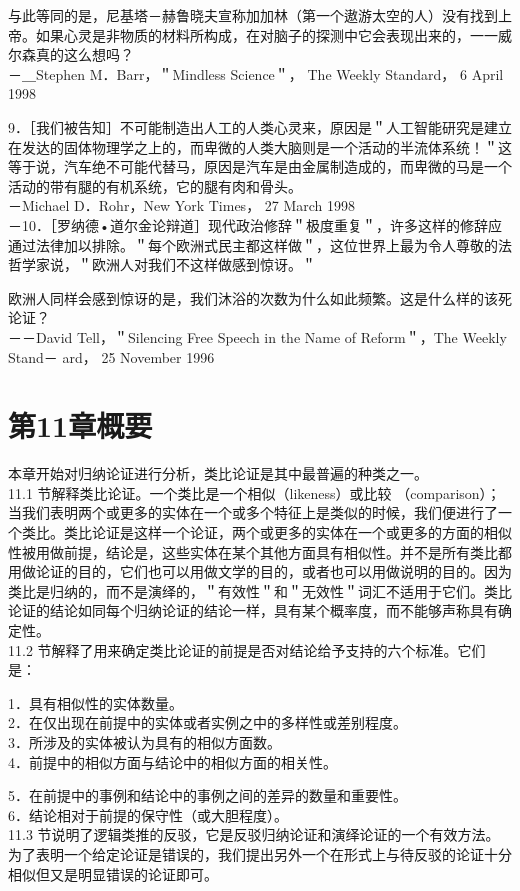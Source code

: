与此等同的是，尼基塔－赫鲁晓夫宣称加加林（第一个遨游太空的人）没有找到上帝。如果心灵是非物质的材料所构成，在对脑子的探测中它会表现出来的，一一威尔森真的这么想吗？\\
－＿Stephen M．Barr，＂Mindless Science＂， The Weekly Standard， 6 April 1998

9．［我们被告知］不可能制造出人工的人类心灵来，原因是＂人工智能研究是建立在发达的固体物理学之上的，而卑微的人类大脑则是一个活动的半流体系统！＂这等于说，汽车绝不可能代替马，原因是汽车是由金属制造成的，而卑微的马是一个活动的带有腿的有机系统，它的腿有肉和骨头。\\
－Michael D．Rohr，New York Times， 27 March 1998\\
－10．［罗纳德•道尔金论辩道］现代政治修辞＂极度重复＂，许多这样的修辞应通过法律加以排除。＂每个欧洲式民主都这样做＂，这位世界上最为令人尊敬的法哲学家说，＂欧洲人对我们不这样做感到惊讶。＂

欧洲人同样会感到惊讶的是，我们沐浴的次数为什么如此频繁。这是什么样的该死论证？\\
－－David Tell，＂Silencing Free Speech in the Name of Reform＂，The Weekly Stand－ ard， 25 November 1996

\section*{第11章概要}
本章开始对归纳论证进行分析，类比论证是其中最普遍的种类之一。\\
11.1 节解释类比论证。一个类比是一个相似（likeness）或比较 （comparison）；当我们表明两个或更多的实体在一个或多个特征上是类似的时候，我们便进行了一个类比。类比论证是这样一个论证，两个或更多的实体在一个或更多的方面的相似性被用做前提，结论是，这些实体在某个其他方面具有相似性。并不是所有类比都用做论证的目的，它们也可以用做文学的目的，或者也可以用做说明的目的。因为类比是归纳的，而不是演绎的，＂有效性＂和＂无效性＂词汇不适用于它们。类比论证的结论如同每个归纳论证的结论一样，具有某个概率度，而不能够声称具有确定性。\\
11.2 节解释了用来确定类比论证的前提是否对结论给予支持的六个标准。它们是：

1．具有相似性的实体数量。\\
2．在仅出现在前提中的实体或者实例之中的多样性或差别程度。\\
3．所涉及的实体被认为具有的相似方面数。\\
4．前提中的相似方面与结论中的相似方面的相关性。

5．在前提中的事例和结论中的事例之间的差异的数量和重要性。\\
6．结论相对于前提的保守性（或大胆程度）。\\
11.3 节说明了逻辑类推的反驳，它是反驳归纳论证和演绎论证的一个有效方法。为了表明一个给定论证是错误的，我们提出另外一个在形式上与待反驳的论证十分相似但又是明显错误的论证即可。

